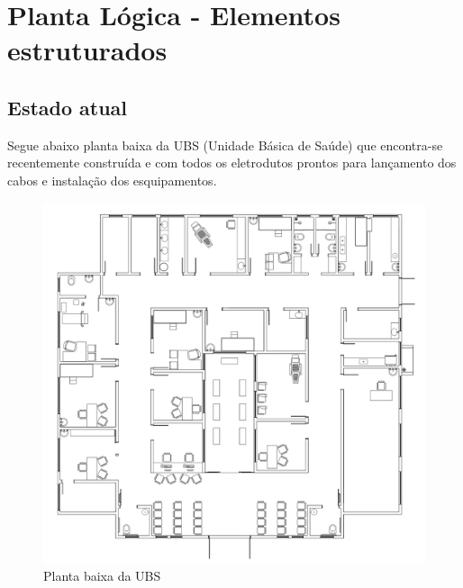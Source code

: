 \documentclass[	DIV=calc,%
							paper=a4,%
							fontsize=12pt,%
							onecolumn]{scrartcl}	 					%
\begin{document}
\section{Planta Lógica - Elementos estruturados}

\subsection{Estado atual}
Segue abaixo planta baixa da UBS (Unidade Básica de Saúde) que encontra-se recentemente construída e com todos os eletrodutos prontos para lançamento dos cabos e instalação dos esquipamentos. 
 
\begin{figure}
	\centering
	\includegraphics[width=\textwidth]{fig1}
	\caption{Planta baixa da UBS}
	\label{fig1}
\end{figure}
\end{document}
